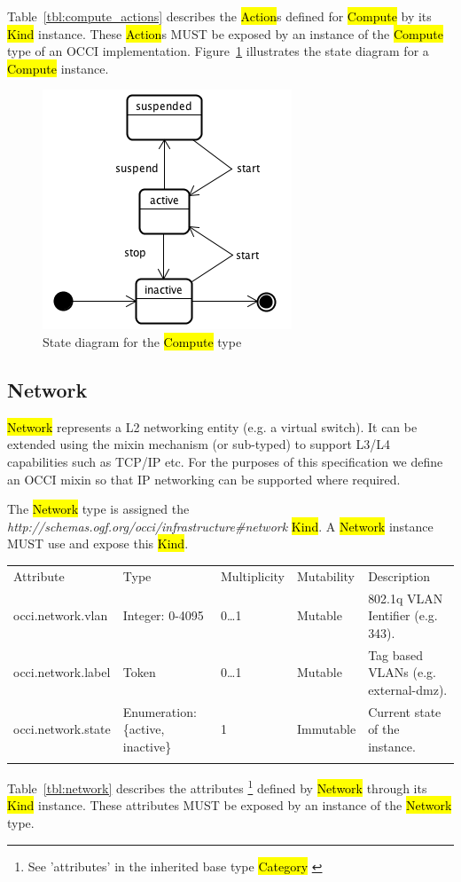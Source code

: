 \documentclass[10pt,a4paper]{article}
\begin{document}
Table~\ref{tbl:compute_actions} describes the \hl{Action}s defined for
\hl{Compute} by its \hl{Kind} instance. These \hl{Action}s MUST be exposed 
by an instance of the \hl{Compute} type of an OCCI implementation. 
Figure~\ref{fig:compute_state} illustrates the state diagram for a \hl{Compute} instance.

\begin{figure}[!h]
	\centering
	\includegraphics[scale=0.4]{figs/compute-state.png}
	\caption{State diagram for the \hl{Compute} type}
	\label{fig:compute_state}
\end{figure}

\subsection{Network}
\hl{Network} represents a L2 networking entity (e.g. a virtual switch). It can be extended using 
the mixin mechanism (or sub-typed) to support L3/L4 capabilities such as TCP/IP etc. 
For the purposes of this specification we define an OCCI mixin so that IP networking can be supported
where required. 

The \hl{Network} type is assigned the \textit{http://schemas.ogf.org/occi/infrastructure\#network} \hl{Kind}. A \hl{Network} instance MUST use and expose this \hl{Kind}.

{
	\begin{tabular}{lp{2.5cm}p{1cm}lp{6cm}}
	\toprule
	Attribute&Type&Multi\-plicity&Mutability&Description\\
	\colrule
	occi.network.vlan & Integer: 0-4095 & 0\ldots1 & Mutable 
	& 802.1q VLAN Ientifier (e.g. 343).\\
	occi.network.label & Token & 0\ldots1 & Mutable 
	& Tag based VLANs (e.g. external-dmz).\\
	occi.network.state & Enumeration: \{active, inactive\} & 1 & Immutable 
	& Current state of the instance.\\
	\botrule
	\end{tabular}
}
Table~\ref{tbl:network} describes the attributes \footnote{See ’attributes’ in the inherited 
base type \hl{Category}  \cite{occi:core}} 
defined by \hl{Network} through its \hl{Kind} instance. These attributes
MUST be exposed by an instance of the \hl{Network} type.
\end{document}
